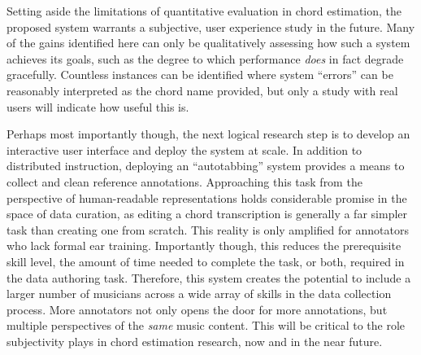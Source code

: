 Setting aside the limitations of quantitative evaluation in chord estimation, the proposed system warrants a subjective, user experience study in the future.
Many of the gains identified here can only be qualitatively assessing how such a system achieves its goals, such as the degree to which performance \emph{does} in fact degrade gracefully.
Countless instances can be identified where system ``errors'' can be reasonably interpreted as the chord name provided, but only a study with real users will indicate how useful this is.

Perhaps most importantly though, the next logical research step is to develop an interactive user interface and deploy the system at scale.
In addition to distributed instruction, deploying an ``autotabbing'' system provides a means to collect and clean reference annotations.
Approaching this task from the perspective of human-readable representations holds considerable promise in the space of data curation, as editing a chord transcription is generally a far simpler task than creating one from scratch.
This reality is only amplified for annotators who lack formal ear training.
Importantly though, this reduces the prerequisite skill level, the amount of time needed to complete the task, or both, required in the data authoring task.
Therefore, this system creates the potential to include a larger number of musicians across a wide array of skills in the data collection process.
More annotators not only opens the door for more annotations, but multiple perspectives of the \emph{same} music content.
This will be critical to the role subjectivity plays in chord estimation research, now and in the near future.


